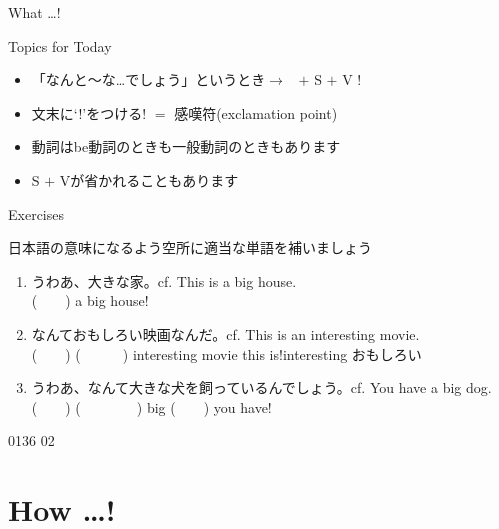 \documentclass[aspectratio=169,xcolor={dvipsnames,table}]{beamer}
\begin{document}
\begin{frame}[plain]{What \ldots ! }
{\begin{block}{Topics for Today}
        \begin{itemize}[square]\small
          \item 「なんと～な\ldots{}でしょう」というとき$\longrightarrow$\,\,\,%
                 $+$ S $+$ V !
          \item   文末に`!'をつける\hfill{\scriptsize ! $=$ 感嘆符(exclamation point)}
          \item 動詞はbe動詞のときも一般動詞のときもあります
          \item S $+$ Vが省かれることもあります
        \end{itemize}
      \end{block}
    }

  \hypertarget{WHAT}{}
  \hfill\hyperlink{HOW}{}
  \hspace{10pt}\hyperlink{USAGE}{}
\end{frame}
\begin{frame}[plain]{Exercises}

  {\small 日本語の意味になるよう空所に適当な単語を補いましょう}
  \begin{enumerate}
    \item うわあ、大きな家。\hfill{\scriptsize cf. This is a big house.}\\
          (~~~~) a big house!
    \item なんておもしろい映画なんだ。\hfill{\scriptsize cf. This is an interesting movie.}\\
          (~~~~) (~~~~~~) interesting movie this is!\hfill{\scriptsize interesting  おもしろい}
    \item うわあ、なんて大きな犬を飼っているんでしょう。\hfill{\scriptsize cf. You have a big dog.}\\
          (~~~~) (~~~~~~~~) big (~~~~) you have!
  \end{enumerate}
  \hfill{\tiny 0136}\,{\scriptsize {}}\,{\tiny 02}
\end{frame}
\section{How \ldots ! }
\end{document}
